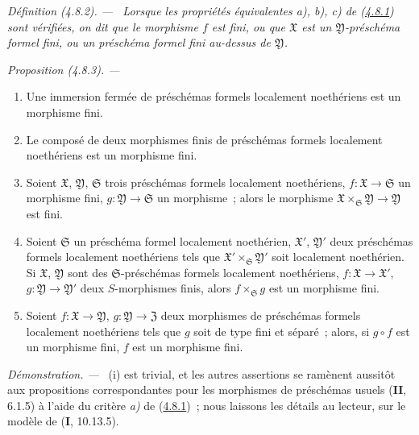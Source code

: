 \documentclass[10pt,oneside]{book}
\newenvironment{definition}[1][]{%
  \par\medskip\noindent\itshape Définition (#1). ---\ }{\par}
\newenvironment{proposition}[1][]{%
  \par\medskip\noindent\itshape Proposition (#1). ---\ }{\par}
\newenvironment{proof}{%
  \par\medskip\noindent\textit{Démonstration. ---\ }}{\par}
\begin{document}
\begin{definition}[4.8.2]
\label{III.4.8.2-fr}
Lorsque les propriétés équivalentes \textup{a), b), c)} de
\textup{(\hyperref[III.4.8.1-fr]{4.8.1})} sont vérifiées, on dit que le morphisme $f$
est fini, ou que $\mathfrak X$ est un $\mathfrak Y$-préschéma
formel fini, ou un préschéma formel fini au-dessus de $\mathfrak Y$.
\end{definition}

\begin{proposition}[4.8.3]
\label{III.4.8.3-fr}
\begin{enumerate}
\item[\textup{(i)}] Une immersion fermée de préschémas formels localement noethériens
  est un morphisme fini.
\item[\textup{(ii)}] Le composé de deux morphismes finis de préschémas formels
  localement noethériens est un morphisme fini.
\item[\textup{(iii)}] Soient $\mathfrak X$, $\mathfrak Y$, $\mathfrak S$ trois
  préschémas formels localement noethériens, $f:\mathfrak X\to\mathfrak S$ un
  morphisme fini, $g:\mathfrak Y\to\mathfrak S$ un morphisme~; alors le
  morphisme
  $\mathfrak X\times_{\mathfrak S}\mathfrak Y\to\mathfrak Y$ est fini.
\item[\textup{(iv)}] Soient $\mathfrak S$ un préschéma formel localement noethérien,
  $\mathfrak X'$, $\mathfrak Y'$ deux préschémas formels localement
  noethériens tels que $\mathfrak X'\times_{\mathfrak S}\mathfrak Y'$ soit
  localement noethérien. Si $\mathfrak X$, $\mathfrak Y$ sont des
  $\mathfrak S$-préschémas formels localement noethériens,
  $f:\mathfrak X\to\mathfrak X'$, $g:\mathfrak Y\to\mathfrak Y'$ deux
  $S$-morphismes finis, alors $f\times_{\mathfrak S}g$ est un
  morphisme fini.
\item[\textup{(v)}] Soient $f:\mathfrak X\to\mathfrak Y$,
  $g:\mathfrak Y\to\mathfrak Z$ deux morphismes de préschémas formels
  localement noethériens tels que $g$ soit de type fini et séparé~; alors, si
  $g\circ f$ est un morphisme fini, $f$ est un morphisme fini.
\end{enumerate}
\end{proposition}

\begin{proof}
(i) est trivial, et les autres assertions se ramènent aussitôt aux
propositions correspondantes pour les morphismes de préschémas usuels
(\textbf{II}, 6.1.5) à l'aide du critère \emph{a)} de
(\hyperref[III.4.8.1-fr]{4.8.1})~; nous laissons les détails au lecteur, sur le
modèle de (\textbf{I}, 10.13.5).
\end{proof}
\end{document}
